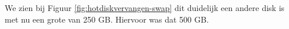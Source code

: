 We zien bij Figuur \ref{fig:hotdiskvervangen-swap} dit duidelijk een andere disk is met nu een grote van 250 GB. Hiervoor was dat 500 GB.


